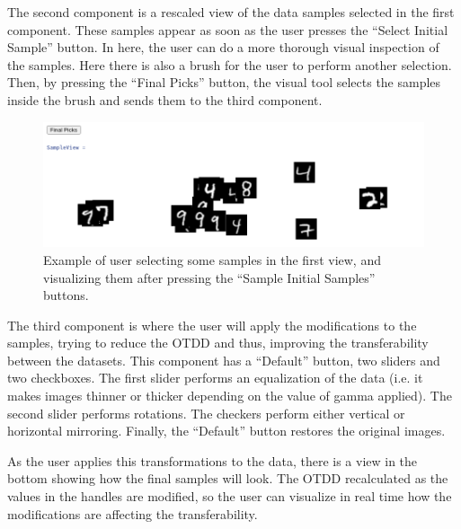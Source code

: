 \documentclass[10pt]{article}
\theoremstyle{definition}
\begin{document}
The second component is a rescaled view of the data samples selected in the first
component. These samples appear as soon as the user presses the ``Select Initial Sample''
button. In here, the user can do a more thorough visual inspection of the samples.
Here there is also a brush for the user to perform another selection.
Then, by pressing the ``Final Picks'' button, the visual tool selects the samples
inside the brush and sends them to the third component.

\begin{figure}[H]
  \centering
  \includegraphics[width=14cm]{Figures/secondscreen.png}
  \caption{Example of user selecting some samples in the first view, and visualizing them
  after pressing the ``Sample Initial Samples'' buttons.}
  \label{fig:secondscreen}
\end{figure}

The third component is where the user will apply the modifications to the samples,
trying to reduce the OTDD and thus, improving the transferability between the datasets.
This component has a ``Default'' button, two sliders and two checkboxes. The first slider performs
an equalization of the data (i.e. it makes images thinner or thicker depending on
the value of gamma applied). The second slider performs rotations.
The checkers perform either vertical or horizontal mirroring. Finally, the ``Default''
button restores the original images.

As the user applies this transformations to the data, there is a view
in the bottom showing how the final samples will look. The OTDD recalculated
as the values in the handles are modified, so the user can visualize in real
time how the modifications are affecting the transferability.
\end{document}
